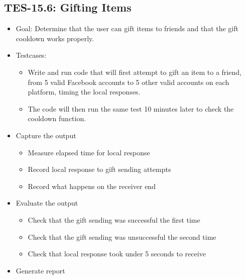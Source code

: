 \subsection{TES-15.6: Gifting Items}
\begin{itemize}
\item Goal: Determine that the user can gift items to friends and that the
gift cooldown works properly.
\item Testcases: 
\begin{itemize}
\item Write and run code that will first attempt to gift an item to a friend, 
from 5 valid Facebook accounts to 5 other valid accounts on each platform, 
timing the local responses.
\item The code will then run the same test 10 minutes later to check the 
cooldown function.
\end{itemize}
\item Capture the output 
\begin{itemize}
\item Measure elapsed time for local response
\item Record local response to gift sending attempts
\item Record what happens on the receiver end
\end{itemize}
\item Evaluate the output 
\begin{itemize}
\item Check that the gift sending was successful the first time
\item Check that the gift sending was unsuccessful the second time
\item Check that local response took under 5 seconds to receive
\end{itemize}
\item Generate report 
\end{itemize}

